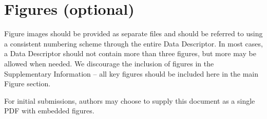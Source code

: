 \section{Figures (optional)}

Figure images should be provided as separate files and should be referred to using a consistent numbering scheme through the entire Data Descriptor.  In most cases, a Data Descriptor should not contain more than three figures, but more may be allowed when needed.  We discourage the inclusion of figures in the Supplementary Information – all key figures should be included here in the main Figure section.  

For initial submissions, authors may choose to supply this document as a single PDF with embedded figures.  

